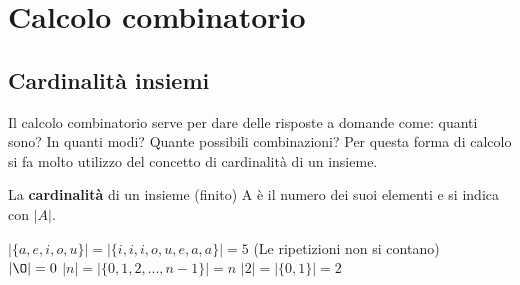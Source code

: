 \newpage
\section{Calcolo combinatorio}

\subsection{Cardinalità insiemi}
Il calcolo combinatorio serve per dare delle risposte a domande come: quanti sono? In quanti modi? Quante possibili combinazioni?
Per questa forma di calcolo si fa molto utilizzo del concetto di cardinalità di un insieme.

\begin{definition}[Cardinalità]
La \textbf{cardinalità} di un insieme (finito) A è il numero dei suoi elementi e si indica con $|A|$.
\end{definition}

\begin{example}
$|\{a,e,i,o,u\}| = |\{i,i,i,o,u,e,a,a\}| = 5$ (Le ripetizioni non si contano)\\
$|\O| = 0$ \hspace{.7cm} $|n| = |\{0,1,2,...,n-1\}| = n$ \hspace{.7cm} $|2| = |\{0,1\}| = 2$
\end{example}

